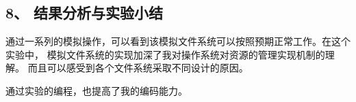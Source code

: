 \documentclass[12bp]{guo}
\begin{document}
\subsection{8、 结果分析与实验小结}

通过一系列的模拟操作，可以看到该模拟文件系统可以按照预期正常工作。在这个实验中，
模拟文件系统的实现加深了我对操作系统对资源的管理实现机制的理解。
而且可以感受到各个文件系统采取不同设计的原因。


通过实验的编程，也提高了我的编码能力。
\end{document}
